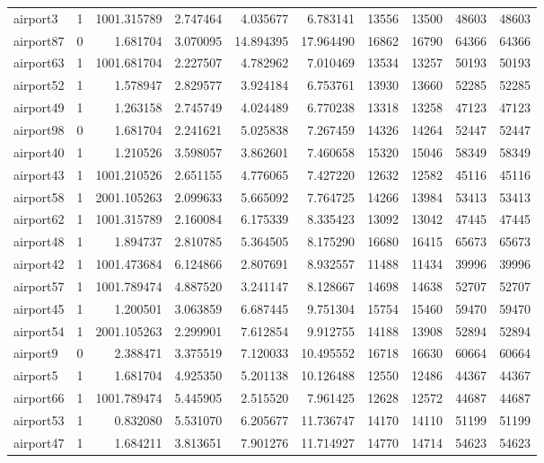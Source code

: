 \begin{longtable}{|l|r|r|r|r|r|r|r|r|r|}
airport3 & 1 & 1001.315789 & 2.747464 & 4.035677 & 6.783141 & 13556 & 13500 & 48603 & 48603 \\
airport87 & 0 & 1.681704 & 3.070095 & 14.894395 & 17.964490 & 16862 & 16790 & 64366 & 64366 \\
airport63 & 1 & 1001.681704 & 2.227507 & 4.782962 & 7.010469 & 13534 & 13257 & 50193 & 50193 \\
airport52 & 1 & 1.578947 & 2.829577 & 3.924184 & 6.753761 & 13930 & 13660 & 52285 & 52285 \\
airport49 & 1 & 1.263158 & 2.745749 & 4.024489 & 6.770238 & 13318 & 13258 & 47123 & 47123 \\
airport98 & 0 & 1.681704 & 2.241621 & 5.025838 & 7.267459 & 14326 & 14264 & 52447 & 52447 \\
airport40 & 1 & 1.210526 & 3.598057 & 3.862601 & 7.460658 & 15320 & 15046 & 58349 & 58349 \\
airport43 & 1 & 1001.210526 & 2.651155 & 4.776065 & 7.427220 & 12632 & 12582 & 45116 & 45116 \\
airport58 & 1 & 2001.105263 & 2.099633 & 5.665092 & 7.764725 & 14266 & 13984 & 53413 & 53413 \\
airport62 & 1 & 1001.315789 & 2.160084 & 6.175339 & 8.335423 & 13092 & 13042 & 47445 & 47445 \\
airport48 & 1 & 1.894737 & 2.810785 & 5.364505 & 8.175290 & 16680 & 16415 & 65673 & 65673 \\
airport42 & 1 & 1001.473684 & 6.124866 & 2.807691 & 8.932557 & 11488 & 11434 & 39996 & 39996 \\
airport57 & 1 & 1001.789474 & 4.887520 & 3.241147 & 8.128667 & 14698 & 14638 & 52707 & 52707 \\
airport45 & 1 & 1.200501 & 3.063859 & 6.687445 & 9.751304 & 15754 & 15460 & 59470 & 59470 \\
airport54 & 1 & 2001.105263 & 2.299901 & 7.612854 & 9.912755 & 14188 & 13908 & 52894 & 52894 \\
airport9 & 0 & 2.388471 & 3.375519 & 7.120033 & 10.495552 & 16718 & 16630 & 60664 & 60664 \\
airport5 & 1 & 1.681704 & 4.925350 & 5.201138 & 10.126488 & 12550 & 12486 & 44367 & 44367 \\
airport66 & 1 & 1001.789474 & 5.445905 & 2.515520 & 7.961425 & 12628 & 12572 & 44687 & 44687 \\
airport53 & 1 & 0.832080 & 5.531070 & 6.205677 & 11.736747 & 14170 & 14110 & 51199 & 51199 \\
airport47 & 1 & 1.684211 & 3.813651 & 7.901276 & 11.714927 & 14770 & 14714 & 54623 & 54623 \\

\end{longtable}
